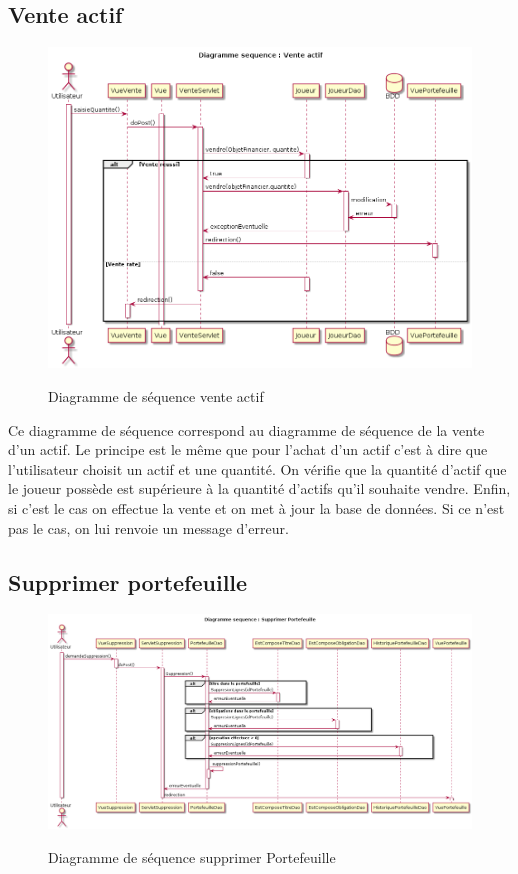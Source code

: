 \subsection{Vente actif}
\begin{figure}[H]
  \center
  \includegraphics[scale=0.25]{../graph/DiagrammeSequenceVenteActif.png} \\
  \caption{Diagramme de séquence vente actif}
\end{figure}

Ce diagramme de séquence correspond au diagramme de séquence de la vente d'un actif. Le principe est le même que pour l'achat d'un actif c'est à dire que l'utilisateur choisit un actif et une quantité. On vérifie que la quantité d'actif que le joueur possède est supérieure à la quantité d'actifs qu'il souhaite vendre. Enfin, si c'est le cas on effectue la vente et on met à jour la base de données. Si ce n'est pas le cas, on lui renvoie un message d'erreur.  

\subsection{Supprimer portefeuille}
\begin{figure}[H]
  \center
  \includegraphics[scale=0.25]{../graph/DiagrammeSequenceSupprimerPortefeuille.png} \\
  \caption{Diagramme de séquence supprimer Portefeuille}
\end{figure}

